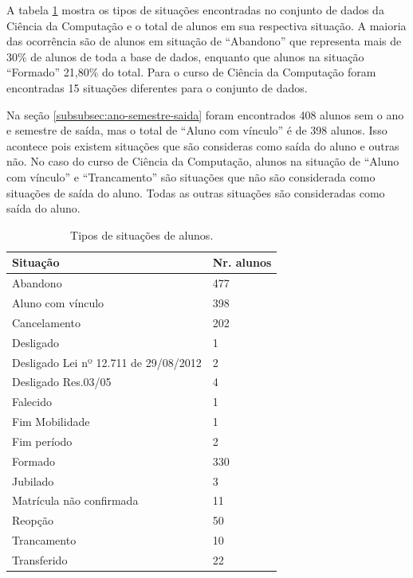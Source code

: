 \documentclass[diss,capa]{texufpel}
\begin{document}
A tabela \ref{tab:situacoes-alunos} mostra os tipos de situações encontradas no conjunto de dados da Ciência da Computação e o total de alunos em sua respectiva situação.
A maioria das ocorrência são de alunos em situação de ``Abandono'' que representa mais de 30\% de alunos de toda a base de dados, enquanto que alunos na situação ``Formado'' 21,80\% do total. 
Para o curso de Ciência da Computação foram encontradas 15 situações diferentes para o conjunto de dados.

Na seção \ref{subsubsec:ano-semestre-saida} foram encontrados 408 alunos sem o ano e semestre de saída, mas o total de ``Aluno com vínculo'' é de 398 alunos.
Isso acontece pois existem situações que são consideras como saída do aluno e outras não.
No caso do curso de Ciência da Computação, alunos na situação de ``Aluno com vínculo'' e ``Trancamento'' são situações que não são considerada como situações de saída do aluno. Todas as outras situações são consideradas como saída do aluno.

\begin{table}[htbp]
\begin{center}
\caption{Tipos de situações de alunos.}
\label{tab:situacoes-alunos}
\begin{tabular}{p{10cm}|p{5cm}}
\hline
Situação                                & Nr. alunos\\ \hline
Abandono                                & 477\\
Aluno com vínculo                       & 398\\
Cancelamento                            & 202\\
Desligado                               &   1\\
Desligado Lei nº 12.711 de 29/08/2012   &   2\\
Desligado Res.03/05                     &   4\\
Falecido                                &   1\\
Fim Mobilidade                          &   1\\
Fim período                             &   2\\
Formado                                 & 330\\
Jubilado                                &   3\\
Matrícula não confirmada                &  11\\
Reopção                                 &  50\\
Trancamento                             &  10\\
Transferido                             &  22\\
\hline
\end{tabular}
\end{center}
\end{table}
\end{document}
